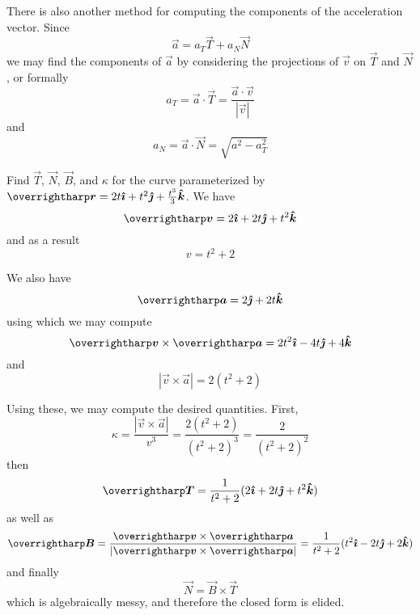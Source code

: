 \documentclass[../main.tex]{subfiles}
\begin{document}
        There is also another method for computing the components of the acceleration vector. Since
        \[
        \vec{a}=a_T\vec{T}+a_N\vec{N}
        \]
        we may find the components of \(\vec{a}\) by considering the projections of \(\vec{v}\) on \(\vec{T}\) and \(\vec{N}\), or formally
        \[
        a_T=\vec{a}\cdot\vec{T}=\frac{\vec{a}\cdot\vec{v}}{|\vec{v}|}
        \]
        and
        \[
        a_N=\vec{a}\cdot\vec{N}=\sqrt{a^2-a_T^2}
        \]

        \begin{example}{}{}
                Find \(\vec{T}\), \(\vec{N}\), \(\vec{B}\), and \(\kappa\) for the curve parameterized by \(\vec{r}=2t\i+t^2\j+\frac{t^3}{3}\k\).
                \tcblower
                We have
                \[
                \vec{v}=2\i+2t\j+t^2\k
                \]
                and as a result
                \[
                v=t^2+2
                \]

                We also have
                \[
                \vec{a}=2\j+2t\k
                \]
                using which we may compute
                \[
                \vec{v}\times\vec{a}=2t^2\i-4t\j+4\k
                \]
                and
                \[
                |\vec{v}\times\vec{a}|=2(t^2+2)
                \]
                
                Using these, we may compute the desired quantities. First,
                \[
                \kappa=\frac{|\vec{v}\times\vec{a}|}{v^3}=\frac{2(t^2+2)}{(t^2+2)^3}=\frac{2}{(t^2+2)^2}
                \]
                then
                \[
                \vec{T}=\frac{1}{t^2+2}(2\i+2t\j+t^2\k)
                \]
                as well as
                \[
                \vec{B}=\frac{\vec{v}\times\vec{a}}{|\vec{v}\times\vec{a}|}=\frac{1}{t^2+2}(t^2\i-2t\j+2\k)
                \]
                and finally
                \[
                \vec{N}=\vec{B}\times\vec{T}
                \]
                which is algebraically messy, and therefore the closed form is elided.
        \end{example}
\end{document}
